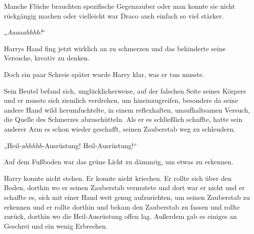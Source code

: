Manche Flüche brauchten spezifische Gegenzauber oder man konnte sie nicht rückgängig machen oder vielleicht war Draco auch einfach so viel stärker.

„\emph{Aaaaahhhh!}“

Harrys Hand fing jetzt wirklich an zu schmerzen und das behinderte seine Versuche, kreativ zu denken.

Doch ein paar Schreie später wurde Harry klar, was er tun musste.

Sein Beutel befand sich, unglücklicherweise, auf der falschen Seite seines Körpers und er musste sich ziemlich verdrehen, um hineinzugreifen, besonders da seine andere Hand wild herumfuchtelte, in einem reflexhaften, unaufhaltsamen Versuch, die Quelle des Schmerzes abzuschütteln. Als er es schließlich schaffte, hatte sein anderer Arm es schon wieder geschafft, seinen Zauberstab weg zu schleudern.

„Heil-\emph{ahhhhh}-Ausrüstung! Heil-Ausrüstung!“

Auf dem Fußboden war das grüne Licht zu dämmrig, um etwas zu erkennen.

Harry konnte nicht stehen. Er konnte nicht kriechen. Er rollte sich über den Boden, dorthin wo er seinen Zauberstab vermutete und dort war er nicht und er schaffte es, sich mit einer Hand weit genug aufzurichten, um seinen Zauberstab zu erkennen und er rollte dorthin und bekam den Zauberstab zu fassen und rollte zurück, dorthin wo die Heil-Ausrüstung offen lag. Außerdem gab es einiges an Geschrei und ein wenig Erbrechen.

